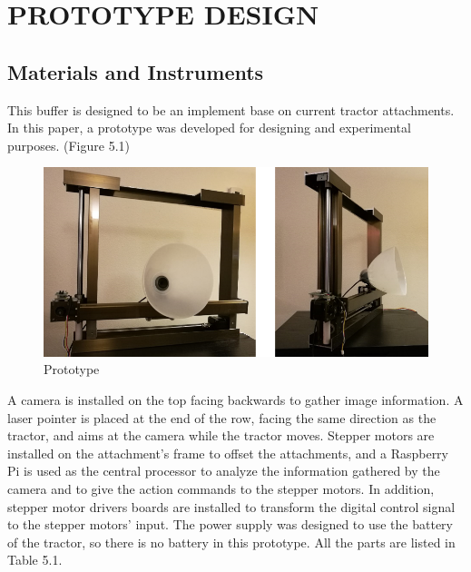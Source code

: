 
\chapter{PROTOTYPE DESIGN}


\section{Materials and Instruments}
This buffer is designed to be an implement base on current tractor attachments. In this paper, a prototype was developed for designing and experimental purposes. (Figure 5.1) 
\begin{figure}[ht!]
\begin{center}
\includegraphics[scale = 0.6]{pics/prototype.png}
\caption{Prototype}
\end{center}
\end{figure}
A camera is installed on the top facing backwards to gather image information. A laser pointer is placed at the end of the row, facing the same direction as the tractor,  and aims at the camera while the tractor moves. Stepper motors are installed on the attachment's frame to offset the attachments, and a Raspberry Pi is used as the central processor to analyze the information gathered by the camera and to give the action commands to the stepper motors. In addition, stepper motor drivers boards are installed to transform the digital control signal to the stepper motors' input. The power supply was designed to use the battery of the tractor, so there is no battery in this prototype. All the parts are listed in Table 5.1.


